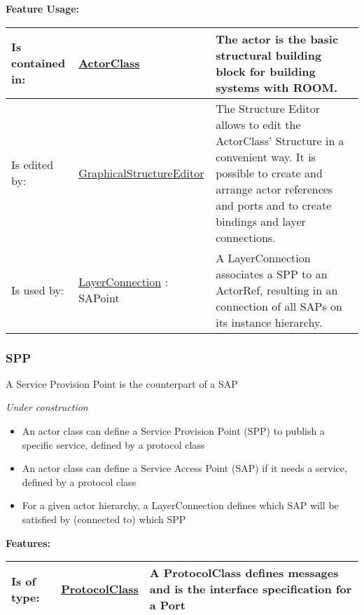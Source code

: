 	\begingroup
	\textbf{Feature Usage:}
	\renewcommand{\arraystretch}{1.8} %
	\begin{longtable}{l|l p{}}
		\hline
	Is contained in: & \tabitem \hyperlink{ref:ActorClass}{ActorClass}  & The actor is the basic structural building block for building systems with ROOM.\\
	\hline
	Is edited by: & \tabitem \hyperlink{ref:GraphicalStructureEditor}{GraphicalStructureEditor}  & The Structure Editor allows to edit the ActorClass' Structure in a convenient way. It is possible to create and arrange actor references and ports and to create bindings and layer connections.\\
	\hline
	Is used by: & \tabitem \hyperlink{ref:LayerConnection}{LayerConnection} : SAPoint & A LayerConnection associates a SPP to an ActorRef, resulting in an connection of all SAPs on its instance hierarchy.\\
	\hline
	\end{longtable}
	\endgroup
		
	
	\vspace{\baselineskip}
	\vspace{\baselineskip}
	\vspace{\baselineskip}
	
\subsubsection{SPP}
	\hypertarget{ref:SPP}{}
	A Service Provision Point is the counterpart of a SAP
		
	\emph{Under construction}
	\begin{itemize}
	\item An actor class can define a Service Provision Point (SPP) to publish a specific service, defined by a protocol class
	\item An actor class can define a Service Access Point (SAP) if it needs a service, defined by a protocol class
	\item For a given actor hierarchy, a LayerConnection defines which SAP will be satisfied by (connected to) which SPP
	\end{itemize}
		
		
	\begingroup
	\textbf{Features:}
	\renewcommand{\arraystretch}{1.8} %
	\begin{longtable}{l|l p{}}
		\hline
	Is of type: & \tabitem \hyperlink{ref:ProtocolClass}{ProtocolClass}  & A ProtocolClass defines messages and is the interface specification for a Port\\
	\hline
	\end{longtable}
	\endgroup
		
